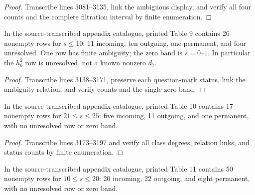\begin{proof}
  Transcribe lines 3081--3135, link the ambiguous display, and verify all four
  counts and the complete filtration interval by finite enumeration.
\end{proof}

\begin{proposition}
  \label{data:table-s126-low}
  \notready
  In the source-transcribed appendix catalogue, printed Table 9 contains 26 nonempty rows
  for $s\le10$: 11 incoming, ten outgoing, one permanent, and four unresolved.
  One row has finite ambiguity; the zero band is $s=0$--$1$.  In particular the
  $h_6^2$ row is unresolved, not a known nonzero $d_7$.
\end{proposition}

\begin{proof}
  Transcribe lines 3138--3171, preserve each question-mark status, link the
  ambiguity relation, and verify counts and the single zero band.
\end{proof}

\begin{proposition}
  \label{data:table-s127-high}
  \notready
  In the source-transcribed appendix catalogue, printed Table 10 contains 17 nonempty rows
  for $21\le s\le25$: five incoming, 11 outgoing, and one permanent, with no
  unresolved row or zero band.
\end{proposition}

\begin{proof}
  Transcribe lines 3173--3197 and verify all class degrees, relation links, and
  status counts by finite enumeration.
\end{proof}

\begin{proposition}
  \label{data:table-s127-middle}
  \notready
  In the source-transcribed appendix catalogue, printed Table 11 contains 50 nonempty rows
  for $10\le s\le20$: 20 incoming, 22 outgoing, and eight permanent, with no
  unresolved row or zero band.
\end{proposition}

